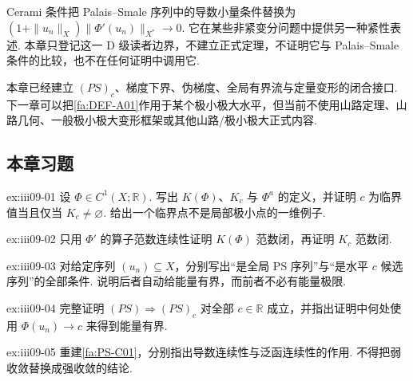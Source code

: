 \begin{FARemark}
Cerami 条件把 Palais--Smale 序列中的导数小量条件替换为
\(\displaystyle (1+\|u_n\|_X)\|\Phi'(u_n)\|_{X^*}\longrightarrow0\).
它在某些非紧变分问题中提供另一种紧性表述. 本章只登记这一 D 级读者边界，不建立正式定理，不证明它与 Palais--Smale 条件的比较，也不在任何证明中调用它.
\end{FARemark}

\begin{FARemark}[III-10 边界]
本章已经建立 \(\displaystyle(PS)_c\)、梯度下界、伪梯度、全局有界流与定量变形的闭合接口. 下一章可以把\autoref{fa:DEF-A01}作用于某个极小极大水平，但当前不使用山路定理、山路几何、一般极小极大变形框架或其他山路/极小极大正式内容.
\end{FARemark}

\subsection*{本章习题}\label{sec:iii09-exercises}

\begin{FAExercise}[临界点与临界值]{ex:iii09-01}
设 \(\displaystyle\Phi\in C^1(X;\mathbb R)\). 写出 \(\displaystyle K(\Phi)\)、\(\displaystyle K_c\) 与 \(\displaystyle\Phi^a\) 的定义，并证明 \(\displaystyle c\) 为临界值当且仅当 \(\displaystyle K_c\neq\varnothing\). 给出一个临界点不是局部极小点的一维例子.
\end{FAExercise}

\begin{FAExercise}[临界点集闭性]{ex:iii09-02}
只用 \(\displaystyle\Phi'\) 的算子范数连续性证明 \(\displaystyle K(\Phi)\) 范数闭，再证明 \(\displaystyle K_c\) 范数闭.
\end{FAExercise}

\begin{FAExercise}{ex:iii09-03}
对给定序列 \(\displaystyle(u_n)\subseteq X\)，分别写出“是全局 PS 序列”与“是水平 \(\displaystyle c\) 候选序列”的全部条件. 说明后者自动给能量有界，而前者不必有能量极限.
\end{FAExercise}

\begin{FAExercise}{ex:iii09-04}
完整证明 \(\displaystyle(PS)\Rightarrow(PS)_c\) 对全部 \(\displaystyle c\in\mathbb R\) 成立，并指出证明中何处使用 \(\displaystyle\Phi(u_n)\to c\) 来得到能量有界.
\end{FAExercise}

\begin{FAExercise}{ex:iii09-05}
重建\autoref{fa:PS-C01}，分别指出导数连续性与泛函连续性的作用. 不得把弱收敛替换成强收敛的结论.
\end{FAExercise}

